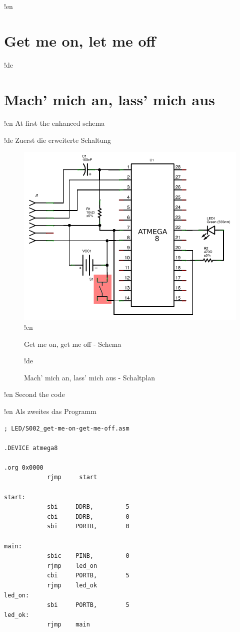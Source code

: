 !en \section{Get me on, let me off}
!de \section{Mach' mich an, lass' mich aus}

!en At first the enhanced schema

!de Zuerst die erweiterte Schaltung

\begin{figure}[htbp]
  \centering
  \includegraphics[width=120mm]{LED/S002_get-me-on-get-me-off_Circuit_schema.png}
!en   \caption{Get me on, get me off - Schema}
!de   \caption{Mach' mich an, lass' mich aus - Schaltplan}
  \label{atmega8-get-me-on-get-me-off-schema}
  \label{atmega8-get-me-on-get-me-off-schema}
\end{figure}


!en Second the code

!en Als zweites das Programm


\begin{lstlisting}
; LED/S002_get-me-on-get-me-off.asm

.DEVICE atmega8

.org 0x0000
            rjmp     start

start:
            sbi     DDRB,         5
            cbi     DDRB,         0
            sbi     PORTB,        0

main:
            sbic    PINB,         0
            rjmp    led_on
            cbi     PORTB,        5
            rjmp    led_ok
led_on:
            sbi     PORTB,        5
led_ok:
            rjmp    main
\end{lstlisting}

